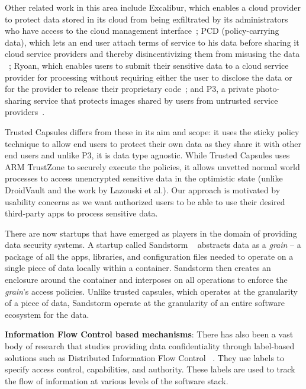 Other related work in this area include Excalibur, which enables a cloud
provider to protect data stored in its cloud from being exfiltrated by its
administrators who have access to the cloud management
interface~\cite{excalibur}; PCD (policy-carrying data), which lets an end user
attach terms of service to his data before sharing it cloud service providers
and thereby disincentivizing them from misusing the data ~\cite{policydata};
Ryoan, which enables users to submit their sensitive data to a cloud service
provider for processing without requiring either the user to disclose the data
or for the provider to release their proprietary code~\cite{ryoan}; and P3, a
private photo-sharing service that protects images shared by users from
untrusted service providers~\cite{p3}.

Trusted Capsules differs from these in its aim and scope: it uses the sticky
policy technique to allow end users to protect their own data as they share it
with other end users and unlike P3, it is data type agnostic. While Trusted
Capsules uses ARM TrustZone to securely execute the policies, it allows unvetted
normal world processes to access unencrypted sensitive data in the optimistic
state (unlike DroidVault and the work by Lazouski et al.). Our approach is
motivated by usability concerns as we want authorized users to be able to use
their desired third-party apps to process sensitive data.

There are now startups that have emerged as players in the domain of providing
data security systems. A startup called Sandstorm ~\cite{sandstorm} abstracts
data as a \textit{grain} -- a package of all the apps, libraries, and
configuration files needed to operate on a single piece of data locally within a
container. Sandstorm then creates an enclosure around the container and
interposes on all operations to enforce the \textit{grain}'s access policies.
Unlike trusted capsules, which operates at the granularity of a piece of data,
Sandstorm operate at the granularity of an entire software ecosystem for the
data.

\textbf{Information Flow Control based mechanisms}: There has also been a vast
body of research that studies providing data confidentiality through label-based
solutions such as Distributed Information Flow Control ~\cite{jif, asbestos,
histar, dstar, laminar, aeolus, flume}. They use labels to specify access
control, capabilities, and authority. These labels are used to track the flow of
information at various levels of the software stack. 

